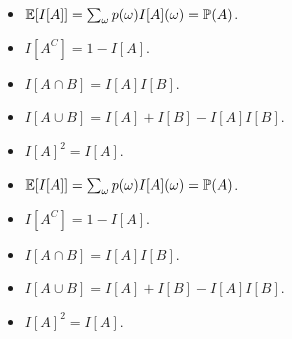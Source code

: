 \begin{note}
  \begin{field}
    \begin{prop}\leavevmode
      \begin{itemize}
        \item $\mathbb{E}[I[A]] = \sum_\omega p(\omega) I[A](\omega) = \mathbb{P}(A)$.
        \item $I[A^C] = 1 - I[A]$.
        \item $I[A\cap B] = I[A]I[B]$.
        \item $I[A\cup B] = I[A] + I[B] - I[A]I[B]$.
        \item $I[A]^2 = I[A]$.
      \end{itemize}
    \end{prop}
  \end{field}
  \begin{field}
    \begin{prop}\leavevmode
      \begin{itemize}
        \item $\mathbb{E}[I[A]] = \sum_\omega p(\omega) I[A](\omega) = \mathbb{P}(A)$.
        \item $I[A^C] = 1 - I[A]$.
        \item $I[A\cap B] = I[A]I[B]$.
        \item $I[A\cup B] = I[A] + I[B] - I[A]I[B]$.
        \item $I[A]^2 = I[A]$.
      \end{itemize}
    \end{prop}
  \end{field}
  \xplain{}%
\end{note}

